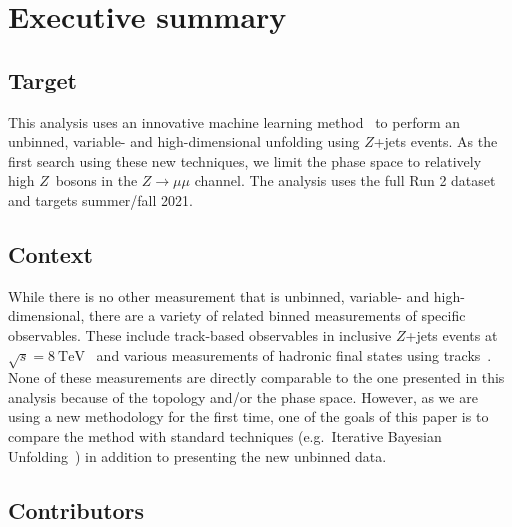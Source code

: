 \documentclass[NOTE, atlasdraft=true, texlive=2016, UKenglish]{\ATLASLATEXPATH atlasdoc}
\begin{document}
\maketitle

\tableofcontents


\clearpage

\section{Executive summary}
\label{sec:exec}

\subsection{Target}

This analysis uses an innovative machine learning method~\cite{1911.09107} to perform an unbinned, variable- and high-dimensional unfolding using $Z$+jets events. As the first search using these new techniques, we limit the phase space to relatively high \pt{} $Z$~bosons in the $Z\to\mu\mu$ channel.   The analysis uses the full Run 2 dataset and targets summer/fall 2021.

\subsection{Context}

While there is no other measurement that is unbinned, variable- and high-dimensional, there are a variety of related binned measurements of specific observables.   These include track-based observables in inclusive $Z$+jets events at $\sqrt{s}=\SI{8}{\TeV}$~\cite{STDM-2015-14} and various measurements of hadronic final states using tracks~\cite{STDM-2018-57,STDM-2017-33,STDM-2017-16}.  None of these measurements are directly comparable to the one presented in this analysis because of the topology and/or the phase space.  However, as we are using a new methodology for the first time, one of the goals of this paper is to compare the method with standard techniques (e.g.\ Iterative Bayesian Unfolding~\cite{DAGOSTINI1995487,1974AJ.....79..745L,Richardson:72}) in addition to presenting the new unbinned data.

\subsection{Contributors}
\end{document}
